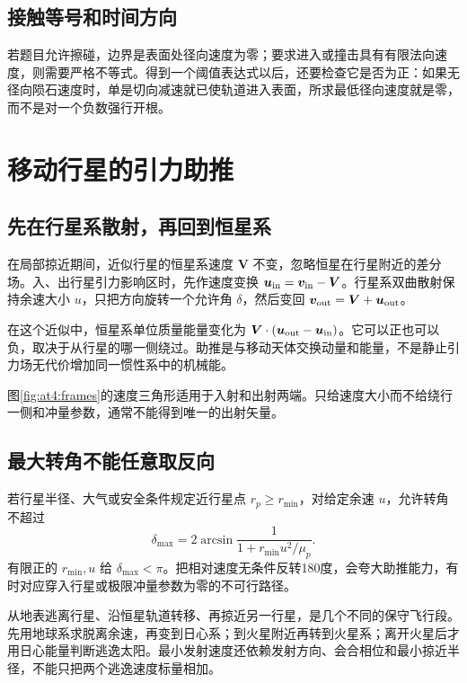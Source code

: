 \subsection{接触等号和时间方向}

若题目允许擦碰，边界是表面处径向速度为零；要求进入或撞击具有有限法向速度，则需要严格不等式。得到一个阈值表达式以后，还要检查它是否为正：如果无径向陨石速度时，单是切向减速就已使轨道进入表面，所求最低径向速度就是零，而不是对一个负数强行开根。


\section{移动行星的引力助推}
\subsection{先在行星系散射，再回到恒星系}

在局部掠近期间，近似行星的恒星系速度 $\bm V$ 不变，忽略恒星在行星附近的差分场。入、出行星引力影响区时，先作速度变换 $\bm u_{\rm in}=\bm v_{\rm in}-\bm V$。行星系双曲散射保持余速大小 $u$，只把方向旋转一个允许角 $\delta$，然后变回 $\bm v_{\rm out}=\bm V+\bm u_{\rm out}$。

在这个近似中，恒星系单位质量能量变化为 $\bm V\cdot(\bm u_{\rm out}-\bm u_{\rm in})$。它可以正也可以负，取决于从行星的哪一侧绕过。助推是与移动天体交换动量和能量，不是静止引力场无代价增加同一惯性系中的机械能。

图\ref{fig:at4:frames}的速度三角形适用于入射和出射两端。只给速度大小而不给绕行一侧和冲量参数，通常不能得到唯一的出射矢量。\subsection{最大转角不能任意取反向}

若行星半径、大气或安全条件规定近行星点 $r_p\ge r_{\min}$，对给定余速 $u$，允许转角不超过
\[\delta_{\max}=2\arcsin\frac1{1+r_{\min}u^2/\mu_p}.\]
有限正的 $r_{\min},u$ 给 $\delta_{\max}<\pi$。把相对速度无条件反转180度，会夸大助推能力，有时对应穿入行星或极限冲量参数为零的不可行路径。

从地表逃离行星、沿恒星轨道转移、再掠近另一行星，是几个不同的保守飞行段。先用地球系求脱离余速，再变到日心系；到火星附近再转到火星系；离开火星后才用日心能量判断逃逸太阳。最小发射速度还依赖发射方向、会合相位和最小掠近半径，不能只把两个逃逸速度标量相加。


